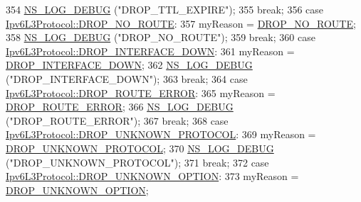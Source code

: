 \begin{DoxyCode}
354           \hyperlink{group__logging_ga413f1886406d49f59a6a0a89b77b4d0a}{NS\_LOG\_DEBUG} (\textcolor{stringliteral}{"DROP\_TTL\_EXPIRE"});
355           \textcolor{keywordflow}{break};
356         \textcolor{keywordflow}{case} \hyperlink{classns3_1_1Ipv6L3Protocol_a33c64db9bc35f71ff368b132bfffa37aa97de4f69c19b2f94b684448beee892f4}{Ipv6L3Protocol::DROP\_NO\_ROUTE}:
357           myReason = \hyperlink{classns3_1_1Ipv6FlowProbe_ac81e6b10f93e4d47d440d1df59b1e6b1a1125d07c08658de93642af7d891c5b57}{DROP\_NO\_ROUTE};
358           \hyperlink{group__logging_ga413f1886406d49f59a6a0a89b77b4d0a}{NS\_LOG\_DEBUG} (\textcolor{stringliteral}{"DROP\_NO\_ROUTE"});
359           \textcolor{keywordflow}{break};
360         \textcolor{keywordflow}{case} \hyperlink{classns3_1_1Ipv6L3Protocol_a33c64db9bc35f71ff368b132bfffa37aa72b499545685a47a7cf3588d1330d5d0}{Ipv6L3Protocol::DROP\_INTERFACE\_DOWN}:
361           myReason = \hyperlink{classns3_1_1Ipv6FlowProbe_ac81e6b10f93e4d47d440d1df59b1e6b1a86c2bf170dc6c21e0b83ae6e48d7a37c}{DROP\_INTERFACE\_DOWN};
362           \hyperlink{group__logging_ga413f1886406d49f59a6a0a89b77b4d0a}{NS\_LOG\_DEBUG} (\textcolor{stringliteral}{"DROP\_INTERFACE\_DOWN"});
363           \textcolor{keywordflow}{break};
364         \textcolor{keywordflow}{case} \hyperlink{classns3_1_1Ipv6L3Protocol_a33c64db9bc35f71ff368b132bfffa37aa3690e9264e4d2307050512b833df4946}{Ipv6L3Protocol::DROP\_ROUTE\_ERROR}:
365            myReason = \hyperlink{classns3_1_1Ipv6FlowProbe_ac81e6b10f93e4d47d440d1df59b1e6b1addf23d467c3d536484f0c4073af6339e}{DROP\_ROUTE\_ERROR};
366            \hyperlink{group__logging_ga413f1886406d49f59a6a0a89b77b4d0a}{NS\_LOG\_DEBUG} (\textcolor{stringliteral}{"DROP\_ROUTE\_ERROR"});
367            \textcolor{keywordflow}{break};
368         \textcolor{keywordflow}{case} \hyperlink{classns3_1_1Ipv6L3Protocol_a33c64db9bc35f71ff368b132bfffa37aaaf932a981ea33f927add80ea8ed41b05}{Ipv6L3Protocol::DROP\_UNKNOWN\_PROTOCOL}:
369            myReason = \hyperlink{classns3_1_1Ipv6FlowProbe_ac81e6b10f93e4d47d440d1df59b1e6b1ae3a2f4e3e9bcd956e2e0301785de9fc3}{DROP\_UNKNOWN\_PROTOCOL};
370            \hyperlink{group__logging_ga413f1886406d49f59a6a0a89b77b4d0a}{NS\_LOG\_DEBUG} (\textcolor{stringliteral}{"DROP\_UNKNOWN\_PROTOCOL"});
371            \textcolor{keywordflow}{break};
372         \textcolor{keywordflow}{case} \hyperlink{classns3_1_1Ipv6L3Protocol_a33c64db9bc35f71ff368b132bfffa37aa803fe59e441ce2bc53f0fe19df60c14a}{Ipv6L3Protocol::DROP\_UNKNOWN\_OPTION}:
373            myReason = \hyperlink{classns3_1_1Ipv6FlowProbe_ac81e6b10f93e4d47d440d1df59b1e6b1a55bff8f9a01f13a7de4883049ac690e1}{DROP\_UNKNOWN\_OPTION};

\end{DoxyCode}
